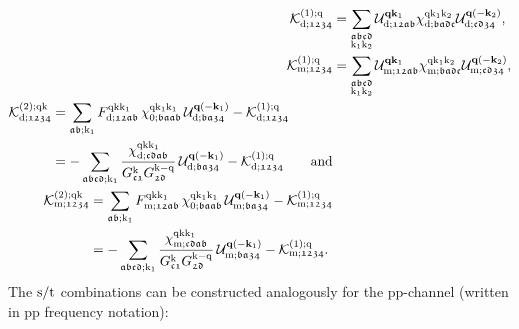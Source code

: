 \documentclass[../../main.tex]{subfiles}
\begin{document}
\begin{subequations}\label{eq:kernel_functions_dens_magn}
\begin{align}
	\mathcal{K}^{(1);\text{q}}_{\text{d};\mathfrak{1234}}&=\sum_{\substack{\mathfrak{abcd}\\\text{k}_1\text{k}_2}} \mathcal{U}^{\textbf{q}\textbf{k}_1}_{\text{d};\mathfrak{12ab}} \chi^{\text{q}\text{k}_1\text{k}_2}_{\text{d};\mathfrak{badc}} \mathcal{U}^{\textbf{q}(-\textbf{k}_2)}_{\text{d};\mathfrak{cd34}},\\
	\mathcal{K}^{(1);\text{q}}_{\text{m};\mathfrak{1234}}&=\sum_{\substack{\mathfrak{abcd}\\\text{k}_1\text{k}_2}} \mathcal{U}^{\textbf{q}\textbf{k}_1}_{\text{m};\mathfrak{12ab}} \chi^{\text{q}\text{k}_1\text{k}_2}_{\text{m};\mathfrak{badc}} \mathcal{U}^{\textbf{q}(-\textbf{k}_2)}_{\text{m};\mathfrak{cd34}},\\
\begin{split}
	\mathcal{K}^{(2);\text{q}\text{k}}_{\text{d};\mathfrak{1234}}&=\sum_{\mathfrak{ab};\text{k}_1} F^{\text{q}\text{k}\text{k}_1}_{\text{d};\mathfrak{12ab}}\,\chi^{\text{q}\text{k}_1\text{k}_1}_{0;\mathfrak{baab}}\,\mathcal{U}^{\textbf{q}(-\textbf{k}_1)}_{\text{d};\mathfrak{ba34}}-\mathcal{K}^{(1);\text{q}}_{\text{d};\mathfrak{1234}}\\
	&=-\sum_{\mathfrak{abcd};\text{k}_1} \frac{\chi^{\text{q}\text{k}\text{k}_1}_{\text{d};\mathfrak{cdab}}}{G^{\text{k}}_{\mathfrak{c1}}G^{\text{k}-\text{q}}_{\mathfrak{2d}}}\,\mathcal{U}^{\textbf{q}(-\textbf{k}_1)}_{\text{d};\mathfrak{ba34}}-\mathcal{K}^{(1);\text{q}}_{\text{d};\mathfrak{1234}}\qquad\text{and}
\end{split}\\
\begin{split}
	\mathcal{K}^{(2);\text{q}\text{k}}_{\text{m};\mathfrak{1234}}&=\sum_{\mathfrak{ab};\text{k}_1} F^{\text{q}\text{k}\text{k}_1}_{\text{m};\mathfrak{12ab}}\,\chi^{\text{q}\text{k}_1\text{k}_1}_{0;\mathfrak{baab}}\,\mathcal{U}^{\textbf{q}(-\textbf{k}_1)}_{\text{m};\mathfrak{ba34}}-\mathcal{K}^{(1);\text{q}}_{\text{m};\mathfrak{1234}}\\
	&=-\sum_{\mathfrak{abcd};\text{k}_1} \frac{\chi^{\text{q}\text{k}\text{k}_1}_{\text{m};\mathfrak{cdab}}}{G^{\text{k}}_{\mathfrak{c1}}G^{\text{k}-\text{q}}_{\mathfrak{2d}}}\,\mathcal{U}^{\textbf{q}(-\textbf{k}_1)}_{\text{m};\mathfrak{ba34}}-\mathcal{K}^{(1);\text{q}}_{\text{m};\mathfrak{1234}}.
\end{split}
\end{align}
\end{subequations}
The $\text{s}/\text{t}$ combinations can be constructed analogously for the pp-channel (written in pp frequency notation):
\end{document}
